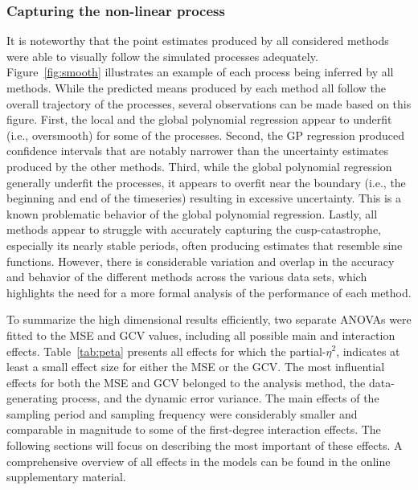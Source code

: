 \documentclass[man, floatsintext]{apa7}
\begin{document}
\subsubsection{Capturing the non-linear process}

It is noteworthy that the point estimates produced by all considered methods
were able to visually follow the simulated processes adequately.
Figure~\ref{fig:smooth} illustrates an example of each process being inferred
by all methods. While the predicted means produced by each method all follow
the overall trajectory of the processes, several observations can be made based
on this figure. First, the local and the global polynomial regression appear to
underfit (i.e., oversmooth) for some of the processes. Second, the GP
regression produced confidence intervals that are notably narrower than the
uncertainty estimates produced by the other methods. Third, while the global
polynomial regression generally underfit the processes, it appears to overfit
near the boundary (i.e., the beginning and end of the timeseries) resulting in
excessive uncertainty. This is a known problematic behavior of the global
polynomial regression. Lastly, all methods appear to struggle with accurately
capturing the cusp-catastrophe, especially its nearly stable periods, often
producing estimates that resemble sine functions. However, there is
considerable variation and overlap in the accuracy and behavior of the
different methods across the various data sets, which highlights the need for a
more formal analysis of the performance of each method.

\begin{sidewaysfigure*}[htbp]
  \caption{Example processes inferred by each of the introduced methods}
  \label{fig:smooth}
\end{sidewaysfigure*}

To summarize the high dimensional results efficiently, two separate ANOVAs were
fitted to the MSE and GCV values, including all possible main and interaction
effects. Table~\ref{tab:peta} presents all effects for which the
partial-$\eta^2$, indicates at least a small effect size for either the MSE or
the GCV\@. The most influential effects for both the MSE and GCV belonged to
the analysis method, the data-generating process, and the dynamic error
variance. The main effects of the sampling period and sampling frequency were
considerably smaller and comparable in magnitude to some of the first-degree
interaction effects. The following sections will focus on describing the most
important of these effects. A comprehensive overview of all effects in the
models can be found in the online supplementary material.
\end{document}
